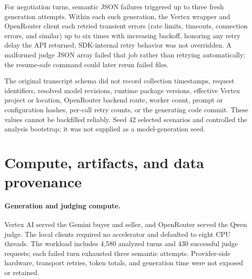 \documentclass{article}
\begin{document}
For negotiation turns, semantic JSON failures triggered up to three fresh
generation attempts. Within each such generation, the Vertex wrapper and
OpenRouter client each retried transient errors (rate limits, timeouts,
connection errors, and similar) up to six times with increasing backoff,
honoring any retry delay the API returned; SDK-internal retry behavior was
not overridden. A malformed judge JSON array failed that job rather than
retrying automatically; the resume-safe command could later rerun failed
files.

The original transcript schema did not record collection timestamps, request
identifiers, resolved model revisions, runtime package versions, effective
Vertex project or location, OpenRouter backend route, worker count, prompt or
configuration hashes, per-call retry counts, or the generating code commit.
These values cannot be backfilled reliably. Seed 42 selected scenarios and
controlled the analysis bootstrap; it was not supplied as a model-generation
seed.

\FloatBarrier

\section{Compute, artifacts, and data provenance}
\label{app:resources}

\paragraph{Generation and judging compute.}
Vertex AI served the Gemini buyer and seller, and OpenRouter served the Qwen
judge. The local clients required no accelerator and defaulted to eight CPU
threads. The workload includes 4,580 analyzed turns and 430 successful judge
requests; each failed turn exhausted three semantic attempts. Provider-side
hardware, transport retries, token totals, and generation time were not
exposed or retained.
\end{document}
